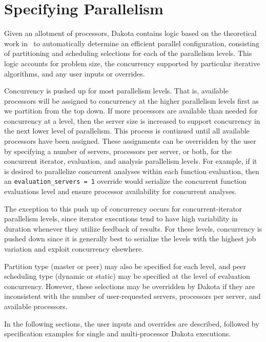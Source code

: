 \section{Specifying Parallelism}\label{parallel:spec}

Given an allotment of processors, Dakota contains logic based on the
theoretical work in~\cite{Eld00} to automatically determine an efficient
parallel configuration, consisting of partitioning and scheduling
selections for each of the parallelism levels. This logic accounts for
problem size, the concurrency supported by particular iterative
algorithms, and any user inputs or overrides. 

Concurrency is pushed up for most parallelism levels. That is,
available processors will be assigned to concurrency at the higher
parallelism levels first as we partition from the top down.  If more
processors are available than needed for concurrency at a level, then
the server size is increased to support concurrency in the next lower
level of parallelism.  This process is continued until all available
processors have been assigned. These assignments can be overridden by
the user by specifying a number of servers, processors per server, or
both, for the concurrent iterator, evaluation, and analysis
parallelism levels. For example, if it is desired to parallelize
concurrent analyses within each function evaluation, then an
\texttt{evaluation\_servers = 1} override would serialize the
concurrent function evaluations level and ensure processor
availability for concurrent analyses.

The exception to this push up of concurrency occurs for
concurrent-iterator parallelism levels, since iterator executions tend
to have high variability in duration whenever they utilize feedback of
results.  For these levels, concurrency is pushed down since it is
generally best to serialize the levels with the highest job variation
and exploit concurrency elsewhere.

Partition type (master or peer) may also be specified for each level, 
and peer scheduling type (dynamic or static) may be specified at the 
level of evaluation concurrency. However, these selections may be 
overridden by Dakota if they are inconsistent with the number of 
user-requested servers, processors per server, and available processors.

In the following sections, the user inputs and overrides are
described, followed by specification examples for single and
multi-processor Dakota executions.

